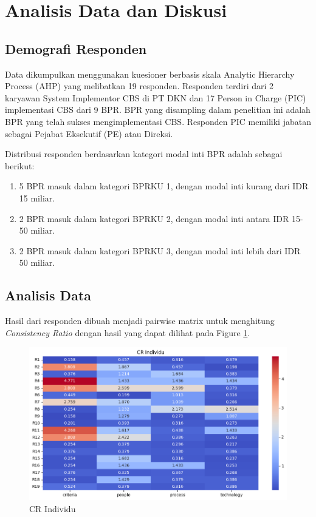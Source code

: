 \documentclass[journal,article,submit,pdftex,moreauthors]{Definitions/mdpi}
\begin{document}
\section{Analisis Data dan Diskusi}

\subsection{Demografi Responden}

Data dikumpulkan menggunakan kuesioner berbasis skala Analytic Hierarchy Process (AHP) yang melibatkan 19 responden. Responden terdiri dari 2 karyawan System Implementor CBS di PT DKN dan 17 Person in Charge (PIC) implementasi CBS dari 9 BPR. BPR yang disampling dalam penelitian ini adalah BPR yang telah sukses mengimplementasi CBS. Responden PIC memiliki jabatan sebagai Pejabat Eksekutif (PE) atau Direksi. 

Distribusi responden berdasarkan kategori modal inti BPR adalah sebagai berikut:
\begin{enumerate}
    \item 5 BPR masuk dalam kategori BPRKU 1, dengan modal inti kurang dari IDR 15 miliar.
    \item 2 BPR masuk dalam kategori BPRKU 2, dengan modal inti antara IDR 15-50 miliar.
    \item 2 BPR masuk dalam kategori BPRKU 3, dengan modal inti lebih dari IDR 50 miliar.
\end{enumerate}




\subsection{Analisis Data}


Hasil dari responden dibuah menjadi pairwise matrix untuk menghitung \textit{Consistency Ratio} dengan hasil yang dapat dilihat pada Figure \ref{fig:saaty_scale_cr}.

\begin{figure}[H]
\includegraphics[width=\textwidth]{attachments/saaty_scale_cr.png}
\caption{CR Individu}
\label{fig:saaty_scale_cr}
\end{figure}   
\end{document}
